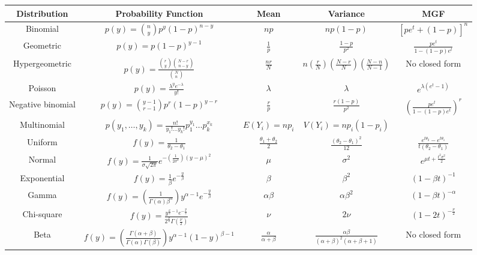 \documentclass[10pt,landscape]{article}
\begin{document}
          \begin{tabularx}{\textwidth}{c c c c c}
            \hline Distribution & Probability Function & Mean &
            Variance & MGF
            \\ \hline Binomial & $p(y)=\binom{n}{y}p^y(1-p)^{n-y}$ &
            $np$ & $np(1-p)$ & $[pe^t+(1-p)]^n$
            \\ Geometric & $p(y) = p(1-p)^{y-1}$ & $\frac{1}{p}$ &
            $\frac{1-p}{p^2}$ & $\frac{pe^t}{1-(1-p)e^t}$
            \\ Hypergeometric & $p(y) = \frac{\binom{r}{y}
              \binom{N-r}{n-y}}{\binom{N}{n}}$ & $\frac{nr}{N}$ & $n
            \left(\frac{r}{N}\right) \left(\frac{N-r}{N}\right)
            \left(\frac{N-n}{N-1}\right) $ & No closed form
            \\ Poisson & $p(y) = \frac{\lambda^y e^{-\lambda}}{y!}$ &
            $\lambda$ & $\lambda$ & $e^{\lambda(e^t-1)}$
            \\ Negative binomial & $p(y) = \binom{y-1}{r-1} p^r
            (1-p)^{y-r}$ & $\frac{r}{p}$ & $\frac{r(1-p)}{p^2}$ &
            $\left(\frac{pe^t}{1-(1-p)e^t}\right)^r$
            \\ Multinomial & $p(y_1, \ldots, y_k) =
            \frac{n!}{y_1!\ldots y_k!}p_1^{y_1}\ldots p_k^{x_k}$ &
            $E(Y_i)=np_i$ & $V(Y_i)=np_i(1-p_i)$
            \\ \hline Uniform & $f(y) = \frac{1}{\theta_2 - \theta_1}$
            & $\frac{\theta_1+\theta_2}{2}$ &
            $\frac{(\theta_2-\theta_1)^2}{12}$ & $\frac{e^{t
                \theta_2}-e^{t \theta_1}}{t(\theta_2 - \theta_1)}$
            \\ Normal & $f(y) = \frac{1}{\sigma \sqrt{2\pi}}e^{-
              \left(\frac{1}{2\sigma^2}\right)(y-\mu)^2}$ & $\mu$ &
            $\sigma^2$ & $e^{\mu t + \frac{t^2 \sigma^2}{2}}$
            \\ Exponential & $f(y) =
            \frac{1}{\beta}e^{-\frac{y}{\beta}}$ & $\beta$ & $\beta^2$
            & $(1-\beta t)^{-1}$
            \\ Gamma & $f(y)=
            \left(\frac{1}{\Gamma(\alpha)\beta^\alpha}\right)y^{\alpha
              - 1}e^{-\frac{y}{\beta}}$ & $\alpha \beta$ & $\alpha
            \beta^2$ & $(1-\beta t)^{-\alpha}$
            \\ Chi-square & $f(y) =
            \frac{y^{\frac{\nu}{2}-1}e^{-\frac{y}{2}}}{2^{\frac{\nu}{2}}\Gamma(\frac{\nu}{2})}$
            & $\nu$ & $2 \nu$ & $(1-2t)^{-\frac{\nu}{2}}$
            \\ Beta & $f(y)= \left(\frac{\Gamma(\alpha +
                \beta)}{\Gamma(\alpha)\Gamma(\beta)}\right)y^{\alpha-1}(1-y)^{\beta
              - 1}$ & $\frac{\alpha}{\alpha + \beta}$ & $\frac{\alpha
              \beta}{(\alpha+\beta)^2(\alpha+\beta+1)}$ & No closed form
          \end{tabularx}
\end{document}
